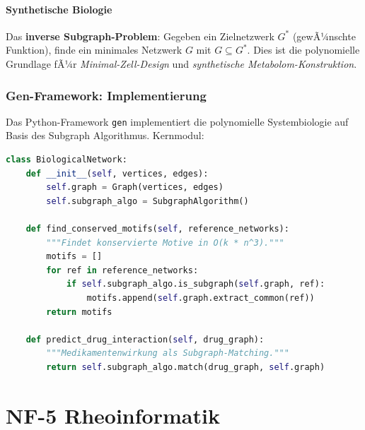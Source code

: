 ﻿\documentclass[a4paper,12pt]{scrreprt}
\theoremstyle{definition}
\begin{document}
\subsection{Synthetische Biologie}

Das \textbf{inverse Subgraph-Problem}: Gegeben ein Zielnetzwerk $G^*$
(gewÃ¼nschte Funktion), finde ein minimales Netzwerk $G$ mit
$G \subseteq G^*$. Dies ist die polynomielle Grundlage fÃ¼r
\emph{Minimal-Zell-Design} und \emph{synthetische Metabolom-Konstruktion}.

\section{Gen-Framework: Implementierung}

Das Python-Framework \texttt{gen} implementiert die polynomielle
Systembiologie auf Basis des Subgraph Algorithmus. Kernmodul:

\begin{lstlisting}[language=Python,caption={Biologische Netzwerkanalyse}]
class BiologicalNetwork:
    def __init__(self, vertices, edges):
        self.graph = Graph(vertices, edges)
        self.subgraph_algo = SubgraphAlgorithm()

    def find_conserved_motifs(self, reference_networks):
        """Findet konservierte Motive in O(k * n^3)."""
        motifs = []
        for ref in reference_networks:
            if self.subgraph_algo.is_subgraph(self.graph, ref):
                motifs.append(self.graph.extract_common(ref))
        return motifs

    def predict_drug_interaction(self, drug_graph):
        """Medikamentenwirkung als Subgraph-Matching."""
        return self.subgraph_algo.match(drug_graph, self.graph)
\end{lstlisting}

\part{NF-5 \quad Rheoinformatik}
\label{part:nf5}

\end{document}
